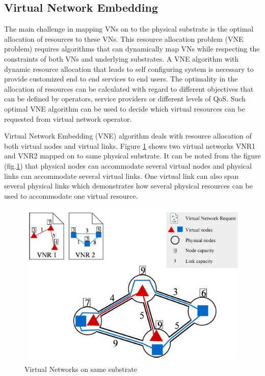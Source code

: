 \documentclass[article,dr=phil,type=msc ,colorback,accentcolor=tud4b]{tudthesis}
\begin{document}
\subsection{Virtual Network Embedding}
The main challenge in mapping VNs on to the physical substrate is the optimal allocation of resources to these VNs. This resource allocation problem (VNE problem) requires algorithms that can dynamically map VNs while respecting the constraints of both VNs and underlying substrates. A VNE algorithm with dynamic resource allocation that leads to self configuring system is necessary to provide customized end to end services to end users. The optimality in the allocation of resources can be calculated with regard to different objectives that can be defined by operators, service providers or different levels of QoS. Such optimal VNE algorithm can be used to decide which virtual resources can be requested from virtual network operator.\newline

Virtual Network Embedding (VNE) algorithm deals with resource allocation of both virtual nodes and virtual links. Figure \ref{fig: VN mapping} shows two virtual networks VNR1 and VNR2 mapped on to same physical substrate. It can be noted from the figure (fig.\ref{fig: VN mapping}) that physical nodes can accommodate several virtual nodes and physical links can accommodate several virtual links. One virtual link can also span several physical links which demonstrates how several physical resources can be used to accommodate one virtual resource.


\begin{figure}[h]
	\centering
	\includegraphics[width=14cm, height=8cm]{VN.jpg}
	\caption{Virtual Networks on same substrate}
	\label{fig: VN mapping}
\end{figure}
\end{document}
